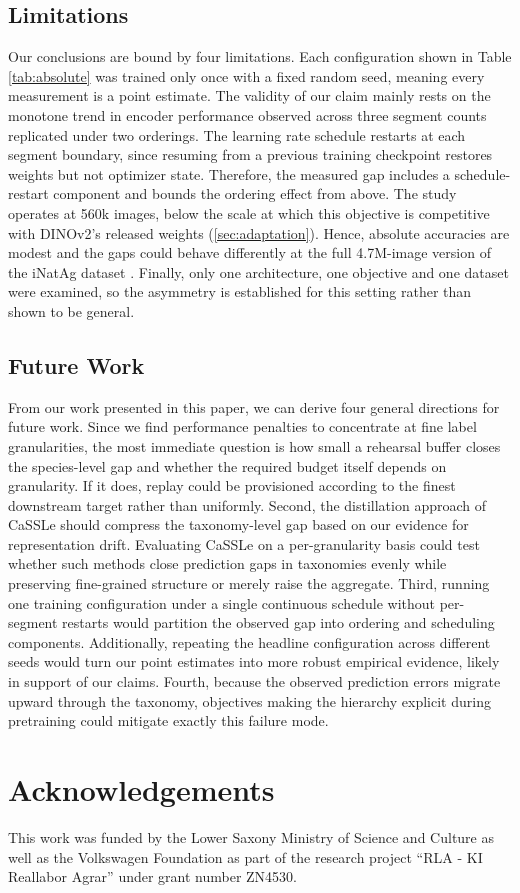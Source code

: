 \documentclass[english]{lni}
\begin{document}
\subsection{Limitations}

Our conclusions are bound by four limitations. Each configuration shown in Table \ref{tab:absolute} was trained only once with a fixed random seed, meaning every measurement is a point estimate. The validity of our claim mainly rests on the monotone trend in encoder performance observed across three segment counts replicated under two orderings. The learning rate schedule restarts at each segment boundary, since resuming from a previous training checkpoint restores weights but not optimizer state. Therefore, the measured gap includes a schedule-restart component \cite{Loshchilov2017} and bounds the ordering effect from above. The study operates at 560k images, below the scale at which this objective is competitive with DINOv2's released weights (\cref{sec:adaptation}). Hence, absolute accuracies are modest and the gaps could behave differently at the full 4.7M-image version of the iNatAg dataset \cite{Jain2025}. Finally, only one architecture, one objective and one dataset were examined, so the asymmetry is established for this setting rather than shown to be general.

\subsection{Future Work}

From our work presented in this paper, we can derive four general directions for future work. Since we find performance penalties to concentrate at fine label granularities, the most immediate question is how small a rehearsal buffer closes the species-level gap and whether the required budget itself depends on granularity. If it does, replay could be provisioned according to the finest downstream target rather than uniformly. Second, the distillation approach of CaSSLe \cite{Fini2022} should compress the taxonomy-level gap based on our evidence for representation drift. Evaluating CaSSLe on a per-granularity basis could test whether such methods close prediction gaps in taxonomies evenly while preserving fine-grained structure or merely raise the aggregate. Third, running one training configuration under a single continuous schedule without per-segment restarts would partition the observed gap into ordering and scheduling components. Additionally, repeating the headline configuration across different seeds would turn our point estimates into more robust empirical evidence, likely in support of our claims. Fourth, because the observed prediction errors migrate upward through the taxonomy, objectives making the hierarchy explicit during pretraining could mitigate exactly this failure mode.

\section*{Acknowledgements}

This work was funded by the Lower Saxony Ministry of Science and Culture as well as the Volkswagen Foundation as part of the research project \enquote{RLA - KI Reallabor Agrar} under grant number ZN4530.

\printbibliography
\end{document}
